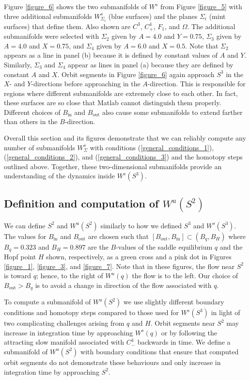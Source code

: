 \documentclass{ws-ijbc}
\begin{document}
Figure \ref{figure_6} shows the two submanifolds of $W^{s}$ from Figure \ref{figure_5} with three additional submanifolds $W^s_{\Sigma_i}$ (blue surfaces) and the planes $\Sigma_i$ (mint surfaces) that define them.  Also shown are $C^3$, $C^4_+$, $F_1$, and $\Omega$.  The additional submanifolds were selected with $\Sigma_2$ given by $A=4.0$ and $Y=0.75$, $\Sigma_3$ given by $A=4.0$ and $X=0.75$, and $\Sigma_4$ given by $A=6.0$ and $X=0.5$.  Note that $\Sigma_2$ appears as a line in panel (b) because it is defined by constant values of $A$ and $Y$. Similarly, $\Sigma_3$ and $\Sigma_4$ appear as lines in panel (a) because they are defined by constant $A$ and $X$.  Orbit segments in Figure \ref{figure_6} again approach $S^3$ in the $X$- and $Y$-directions before approaching in the $A$-direction.  This is responsible for regions where different submanifolds are extremely close to each other.  In fact, these surfaces are so close that Matlab cannot distinguish them properly.  Different choices of $B_{\text{in}}$ and $B_{\text{out}}$ also cause some submanifolds to extend farther than others in the $B$-direction.

Overall this section and its figures demonstrate that we can reliably compute any number of submanifolds $W^s_\Sigma$ with conditions (\ref{general_conditions_1}),  (\ref{general_conditions_2}), and (\ref{general_conditions_3}) and the homotopy steps outlined above.  Together, these two-dimensional submanifolds provide an understanding of the dynamics inside $W^s(S^3)$.

\subsection{Definition and computation of $W^{u}(S^2)$}  

We can define $S^2$ and $W^u(S^2)$ similarly to how we defined $S^3$ and $W^s(S^3)$.  The values for $B_{\text{in}}$ and $B_{\text{out}}$ are chosen such that $[B_{\text{out}}, B_{\text{in}}] \subset (B_q, B_H)$ where $B_q=0.323$ and $B_H= 0.897$ are the $B$-values of the saddle equilibrium $q$ and the Hopf point $H$ shown, respectively, as a green cross and a pink dot in Figures \ref{figure_1}, \ref{figure_3}, and \ref{figure_7}. Note that in these figures, the flow near $S^2$ is toward $q$; hence, to the right of $W^u(q)$ the flow is to the left.  Our choice of $B_{\text{out}}>B_{q}$ is to avoid a change in direction of the flow associated with $q$.

To compute a submanifold of $W^{u}(S^2)$ we use slightly different boundary conditions and homotopy steps compared to those used for $W^s(S^3)$ in light of two complicating challenges arising from $q$ and $H$.  Orbit segments near $S^2$ may increase in integration time by approaching $W^s(q)$ or by following the attracting slow manifold associated with $C^4_-$ backwards in time.  We define a submanifold of $W^u(S^2)$ with boundary conditions that ensure that computed orbit segments do not demonstrate these behaviours and only increase in integration time by approaching $S^2$.  
\end{document}
